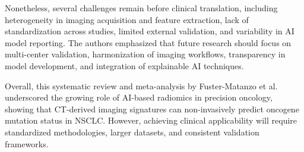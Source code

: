 Nonetheless, several challenges remain before clinical translation, including heterogeneity in imaging acquisition and feature extraction, lack of standardization across studies, limited external validation, and variability in AI model reporting. The authors emphasized that future research should focus on multi-center validation, harmonization of imaging workflows, transparency in model development, and integration of explainable AI techniques.

Overall, this systematic review and meta-analysis by Fuster-Matanzo et al. underscored the growing role of AI-based radiomics in precision oncology, showing that CT-derived imaging signatures can non-invasively predict oncogene mutation status in NSCLC. However, achieving clinical applicability will require standardized methodologies, larger datasets, and consistent validation frameworks.